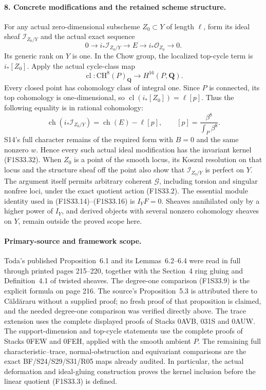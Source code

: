 \paragraph{8. Concrete modifications and the retained scheme structure.}
For any actual zero-dimensional subscheme
$Z_0\subset Y$ of length $\ell$, form its ideal
sheaf $\mathcal I_{Z_0/Y}$ and the actual exact
sequence
\[
 0\longrightarrow i_*\mathcal I_{Z_0/Y}
    \longrightarrow E\longrightarrow i_*\mathcal O_{Z_0}
    \longrightarrow0.
 \tag{F1S33.33}
\]
Its generic rank on $Y$ is one. In the Chow
group, the localized top-cycle term is
$i_*[Z_0]$. Apply the actual cycle-class map
\[
 \operatorname{cl}:\mathrm{CH}^8(P)_{\mathbf Q}
                        \longrightarrow H^{16}(P,\mathbf Q).
\]
Every closed point has cohomology class of
integral one. Since $P$ is connected, its top
cohomology is one-dimensional, so
$\operatorname{cl}(i_*[Z_0])=\ell[p]$.
Thus the following equality is in rational
cohomology:
\[
 \operatorname{ch}(i_*\mathcal I_{Z_0/Y})
       =\operatorname{ch}(E)-\ell[p],
 \qquad
 [p]=\frac{\beta^8}{\int_P\beta^8}.
 \tag{F1S33.34}
\]
S14's full character remains of the required
form with $B=0$ and the same nonzero $w$.
Hence every such actual ideal modification has
the invariant kernel (F1S33.32).
When $Z_0$ is a point of the smooth locus, its
Koszul resolution on that locus and the
structure sheaf off the point also show that
$\mathcal I_{Z_0/Y}$ is perfect on $Y$.
The argument itself permits arbitrary coherent
$\mathcal G$, including torsion and singular
nonfree loci, under the exact quotient action
(F1S33.2).
The essential module identity used in
(F1S33.14)--(F1S33.16) is $I_YF=0$.
Sheaves annihilated only by a higher power of
$I_Y$, and derived objects with several nonzero
cohomology sheaves on $Y$, remain outside the
proved scope here.

\paragraph{Primary-source and framework scope.}
Toda's published Proposition~6.1 and its
Lemmas~6.2--6.4 were read in full through
printed pages 215--220, together with the
Section~4 ring gluing and Definition~4.1 of
twisted sheaves. The degree-one comparison
(F1S33.9) is the explicit formula on page 216.
The source's Proposition~5.3 is attributed there
to C\u ald\u araru without a supplied proof;
no fresh proof of that proposition is claimed,
and the needed degree-one comparison was
verified directly above.
The trace extension uses the complete displayed
proofs of Stacks 0AVB, 031S and 0AUW.
The support-dimension and top-cycle statements
use the complete proofs of Stacks 0FEW and
0FEH, applied with the smooth ambient $P$.
The remaining full characteristic--trace,
normal-obstruction and equivariant comparisons
are the exact BF/S24/S29/S31/R05 maps already
audited. In particular, the actual deformation
and ideal-gluing construction proves the
kernel inclusion before the linear quotient
(F1S33.3) is defined.
